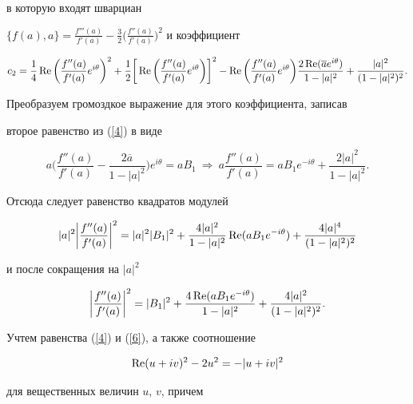 в которую входят шварциан


$\{f(a),a\}=\frac{f'''(a)}{f'(a)}-\frac32\Big(\frac{f''(a)}{f'(a)}


\Big)^2$ и коэффициент


$$


c_2=\frac14\re\bigg(\frac{f''(a)}{f'(a)}e^{i\theta}


\bigg)^2+\frac12\bigg[\re\bigg(\frac{f''(a)}{f'(a)}e^{i\theta}\bigg)\bigg]^2-


\re\bigg(\frac{f''(a)}{f'(a)}e^{i\theta}


\bigg)\frac{2\re(\overline{a}e^{i\theta})}{1-|a|^2}+\frac{|a|^2}{(1-|a|^2)^2}.


$$





Преобразуем громоздкое выражение для этого коэффициента, записав


второе равенство из (\ref{4}) в виде


$$


a\bigg(\frac{f''(a)}{f'(a)}-\frac{2\overline{a}}{1-|a|^2}\bigg)e^{i\theta}=a


B_1\ \Rightarrow \


a\frac{f''(a)}{f'(a)}=aB_1e^{-i\theta}+\frac{2|a|^2}{1-|a|^2}.


$$


Отсюда следует равенство квадратов модулей


$$


|a|^2\bigg|\frac{f''(a)}{f'(a)}\bigg|^2=|a|^2|B_1|^2+


\frac{4|a|^2}{1-|a|^2}\re(a B_1


e^{-i\theta})+\frac{4|a|^4}{(1-|a|^2)^2}


$$


и после сокращения на $|a|^2$


\begin{equation}\label{6}


\bigg|\frac{f''(a)}{f'(a)}\bigg|^2=|B_1|^2+\frac{4\re(a B_1


e^{-i\theta})}{1-|a|^2}+\frac{4|a|^2}{(1-|a|^2)^2}.


\end{equation}


Учтем равенства (\ref{4}) и (\ref{6}), а также соотношение


$$


\re(u+iv)^2-2u^2=-|u+iv|^2


$$


для вещественных величин $u$, $v$, причем


